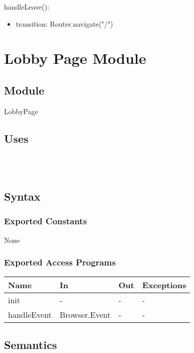 \documentclass[12pt, titlepage]{article}
\begin{document}
\noindent handleLeave():
\begin{itemize}
\item transition: Router.navigate("/")
\end{itemize}

\newpage

\section{Lobby Page Module} \label{LobbyPage}

\subsection{Module}
LobbyPage

\subsection{Uses}
\\
\\

\subsection{Syntax}

\subsubsection{Exported Constants}
None

\subsubsection{Exported Access Programs}

\begin{center}
\begin{tabular}{p{2cm} p{2cm} p{2cm} p{5cm}}
\hline
\textbf{Name} & \textbf{In} & \textbf{Out} & \textbf{Exceptions} \\
\hline
init & - & - & - \\
handleEvent & Browser.Event & - & -\\
\hline
\end{tabular}
\end{center}

\subsection{Semantics}
\end{document}
